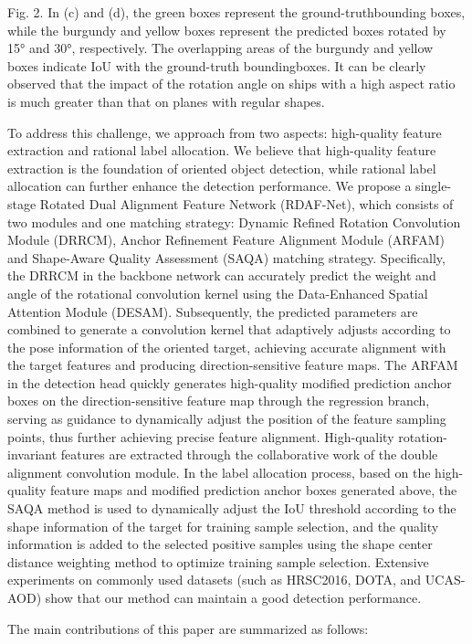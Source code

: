\documentclass[journal]{IEEEtran}
\begin{document}
Fig. 2. In (c) and (d), the green boxes represent the ground-truthbounding boxes, while the burgundy and yellow boxes represent the predicted boxes rotated by 15° and 30°, respectively. The overlapping areas of the burgundy and yellow boxes indicate IoU with the ground-truth boundingboxes. It can be clearly observed that the impact of the rotation angle on ships with a high aspect ratio is much greater than that on planes with regular shapes.

To address this challenge, we approach from two aspects: high-quality feature extraction and rational label allocation. We believe that high-quality feature extraction is the foundation of oriented object detection, while rational label allocation can further enhance the detection performance. We propose a single-stage Rotated Dual Alignment Feature Network (RDAF-Net), which consists of two modules and one matching strategy: Dynamic Refined Rotation Convolution Module (DRRCM), Anchor Refinement Feature Alignment Module (ARFAM) and Shape-Aware Quality Assessment (SAQA) matching strategy. Specifically, the DRRCM in the backbone network can accurately predict the weight and angle of the rotational convolution kernel using the Data-Enhanced Spatial Attention Module (DESAM). Subsequently, the predicted parameters are combined to generate a convolution kernel that adaptively adjusts according to the pose information of the oriented target, achieving accurate alignment with the target features and producing direction-sensitive feature maps. The ARFAM in the detection head quickly generates high-quality modified prediction anchor boxes on the direction-sensitive feature map through the regression branch, serving as guidance to dynamically adjust the position of the feature sampling points, thus further achieving precise feature alignment. High-quality rotation-invariant features are extracted through the collaborative work of the double alignment convolution module. In the label allocation process, based on the high-quality feature maps and modified prediction anchor boxes generated above, the SAQA method is used to dynamically adjust the IoU threshold according to the shape information of the target for training sample selection, and the quality information is added to the selected positive samples using the shape center distance weighting method to optimize training sample selection. Extensive experiments on commonly used datasets (such as HRSC2016, DOTA, and UCAS-AOD) show that our method can maintain a good detection performance.

The main contributions of this paper are summarized as follows:
\end{document}
